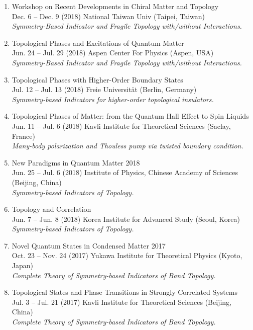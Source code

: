 \documentclass[letterpaper,11pt]{article}
\begin{document}
\begin{enumerate}
\item Workshop on Recent Developments in Chiral Matter and Topology\\
Dec. 6 -- Dec. 9 (2018) National Taiwan Univ (Taipei, Taiwan)\\
\emph{Symmetry-Based Indicator and Fragile Topology with/without Interactions.}

\item Topological Phases and Excitations of Quantum Matter\\
Jun. 24 -- Jul. 29 (2018) Aspen Center For Physics (Aspen, USA)\\
\emph{Symmetry-Based Indicator and Fragile Topology with/without Interactions.}

\item
Topological Phases with Higher-Order Boundary States\\
Jul. 12 -- Jul. 13 (2018) Freie Universit\"at (Berlin, Germany)\\
\emph{Symmetry-based Indicators for higher-order topological insulators.}

\item
Topological Phases of Matter: from the Quantum Hall Effect to Spin Liquids\\
Jun. 11 -- Jul. 6 (2018) Kavli Institute for Theoretical Sciences (Saclay, France)\\
\emph{Many-body polarization and Thouless pump via twisted boundary condition.}

\item
New Paradigms in Quantum Matter 2018\\
Jun. 25 -- Jul. 6 (2018) Institute of Physics, Chinese Academy of Sciences (Beijing, China)\\
\emph{Symmetry-based Indicators of Topology.}

\item
Topology and Correlation\\
Jun. 7 -- Jun. 8 (2018) Korea Institute for Advanced Study (Seoul, Korea)\\
\emph{Symmetry-based Indicators of Topology.}

\item
Novel Quantum States in Condensed Matter 2017\\
Oct. 23 -- Nov. 24 (2017) Yukawa Institute for Theoretical Physics (Kyoto, Japan)\\
\emph{Complete Theory of Symmetry-based Indicators of Band Topology.}

\item
Topological States and Phase Transitions in Strongly Correlated Systems\\
Jul. 3 -- Jul. 21 (2017) Kavli Institute for Theoretical Sciences (Beijing, China)\\
\emph{Complete Theory of Symmetry-based Indicators of Band Topology.}


\end{enumerate}
\end{document}
